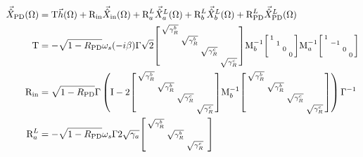 \begingroup
\allowdisplaybreaks
\begin{align}\label{eq:nIS_Xpd}
\vec{\hat X}_\mathrm{PD}(\Omega)&=\text{T}\vec h(\Omega)+\text{R}_\text{in}\vec{\hat X}_\mathrm{in}(\Omega)+\text{R}^L_a\vec{\hat X}^L_a(\Omega)+\text{R}^L_b\vec{\hat X}^L_b(\Omega)+\text{R}^L_\text{PD}\vec{\hat X}^L_\text{PD}(\Omega)\\
\text{T}&=-\sqrt{1-R_\text{PD}}\omega_s(-i\beta)\Gamma \sqrt{2}\begin{bsmallmatrix}
\sqrt{\gamma^b_R} &  &  &  \\
 & \sqrt{\gamma^b_R} &  &  \\
 &  & \sqrt{\gamma^c_R} &  \\
 &  &  & \sqrt{\gamma^c_R}
\end{bsmallmatrix}\text{M}_b^{-1}\begin{bsmallmatrix}
1 &  &  &  \\
 & 1 &  &  \\
 &  & 0 &  \\
 &  &  & 0
\end{bsmallmatrix}\text{M}_a^{-1}\begin{bsmallmatrix}
1 &  &  &  \\
 & -1 &  &  \\
 &  & 0 &  \\
 &  &  & 0
\end{bsmallmatrix}\\
\text{R}_\text{in}&=\sqrt{1-R_\text{PD}}\Gamma\left(\text{I}-2\begin{bsmallmatrix}
\sqrt{\gamma^b_R} &  &  &  \\
 & \sqrt{\gamma^b_R} &  &  \\
 &  & \sqrt{\gamma^c_R} &  \\
 &  &  & \sqrt{\gamma^c_R}
\end{bsmallmatrix}\text{M}_b^{-1}\begin{bsmallmatrix}
\sqrt{\gamma^b_R} &  &  &  \\
 & \sqrt{\gamma^b_R} &  &  \\
 &  & \sqrt{\gamma^c_R} &  \\
 &  &  & \sqrt{\gamma^c_R}
\end{bsmallmatrix}\right)\Gamma^{-1}\\
\text{R}^L_a&=-\sqrt{1-R_\text{PD}}\omega_s\Gamma 2\sqrt{\gamma_a}\begin{bsmallmatrix}
\sqrt{\gamma^b_R} &  &  &  \\
 & \sqrt{\gamma^b_R} &  &  \\
 &  & \sqrt{\gamma^c_R} &  \\

\end{bsmallmatrix}
\end{align}
